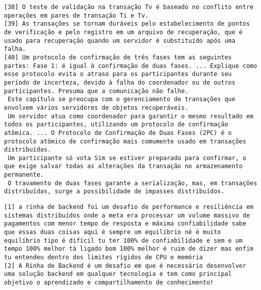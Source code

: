 \documentclass[12pt, a4paper]{article}
\begin{document}
\begin{appendix}
\begin{Verbatim}[frame=single, label={Excertos da Fonte: Sistemas Distribuídos, 5ª Edição (Coulouris et al.)}]
[38] O teste de validação na transação Tv é baseado no conflito entre operações em pares de transação Ti e Tv.
[39] As transações se tornam duráveis pelo estabelecimento de pontos de verificação e pelo registro em um arquivo de recuperação, que é usado para recuperação quando um servidor é substituído após uma falha.
[40] Um protocolo de confirmação de três fases tem as seguintes partes: Fase 1: é igual à confirmação de duas fases. ... Explique como esse protocolo evita o atraso para os participantes durante seu período de incerteza, devido à falha do coordenador ou de outros participantes. Presuma que a comunicação não falhe.
 Este capítulo se preocupa com o gerenciamento de transações que envolvem vários servidores de objetos recuperáveis.
 Um servidor atua como coordenador para garantir o mesmo resultado em todos os participantes, utilizando um protocolo de confirmação atômica. ... O Protocolo de Confirmação de Duas Fases (2PC) é o protocolo atômico de confirmação mais comumente usado em transações distribuídas.
 Um participante só vota Sim se estiver preparado para confirmar, o que exige salvar todas as alterações da transação no armazenamento permanente.
 O travamento de duas fases garante a serialização, mas, em transações distribuídas, surge a possibilidade de impasses distribuídos.
\end{Verbatim}

\begin{Verbatim}[frame=single, label={Excertos da Fonte: Vídeo "Como Venci a Rinha de Backend 2025"}]
[1] a rinha de backend foi um desafio de performance e resiliência em sistemas distribuídos onde a meta era processar um volume massivo de pagamentos com menor tempo de resposta e máxima confiabilidade sabe que essas duas coisas aqui é sempre um equilíbrio né é muito equilíbrio tipo é difícil tu ter 100% de confiabilidade e sem e um tempo 100% melhor tá ligado bom 100% melhor é ruim de dizer mas enfim tu entendeu dentro dos limites rígidos de CPU e memória
[2] A Rinha de Backend é um desafio em que é necessário desenvolver uma solução backend em qualquer tecnologia e tem como principal objetivo o aprendizado e compartilhamento de conhecimento!
\end{Verbatim}

\end{appendix}
\end{document}

